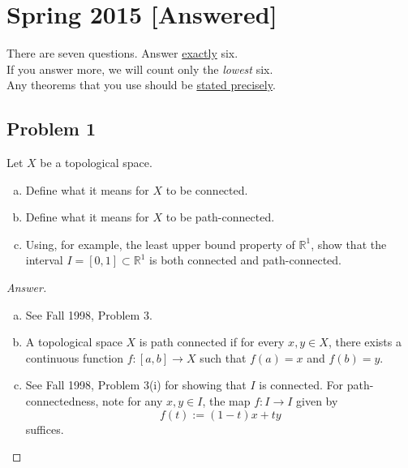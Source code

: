 \documentclass[12pt]{article}
\newcommand{\real}{\mathbb{R}}
\newcommand{\ita}[1]{\textit{#1}}
\theoremstyle{definition}
\begin{document}
\section{Spring 2015 [Answered]}
There are seven questions. Answer \underline{exactly} six. \\
If you answer more, we will count only the \ita{lowest} six. \\
Any theorems that you use should be \underline{stated precisely}.
\subsection{Problem 1}
Let $X$ be a topological space.
\begin{enumerate}[(a)]
    \item Define what it means for $X$ to be connected.
    \item Define what it means for $X$ to be path-connected.
    \item Using, for example, the least upper bound property of $\real^1$, show that the interval $I = [0,1] \subset \real^1$ is both connected and path-connected.
\end{enumerate}
\begin{proof}[Answer]
    \noindent
    \begin{enumerate}[(a)]
        \item See Fall 1998, Problem 3.
        \item A topological space $X$ is path connected if for every $x , y \in X$, there exists a continuous function $f : [a,b] \to X$ such that $f(a) = x$ and $f(b) = y$.
        \item See Fall 1998, Problem 3(i) for showing that $I$ is connected. For path-connectedness, note for any $x , y \in I$, the map $f : I \to I$ given by
        \[
            f(t) := (1-t)x + ty
        \]
        suffices.
    \end{enumerate}
\end{proof}
\end{document}

